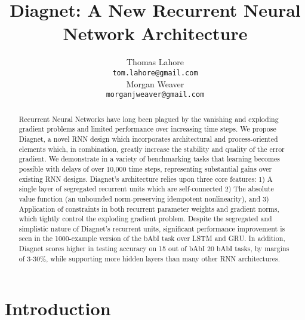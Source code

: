 \documentclass{article}
\title{Diagnet: A New Recurrent Neural Network Architecture}
\author{
	Thomas Lahore\\
	\texttt{tom.lahore@gmail.com}\\
	\And
	Morgan Weaver\\
	\texttt{morganjweaver@gmail.com}
 }
\begin{document}
\maketitle
\begin{abstract}

  Recurrent Neural Networks have long been plagued by the vanishing and exploding gradient problems and limited performance over increasing time steps. We propose Diagnet, a novel RNN design which incorporates architectural and process-oriented elements which, in combination, greatly increase the stability and quality of the error gradient. We demonstrate in a variety of benchmarking tasks that learning becomes possible with delays of over 10,000 time steps, representing substantial gains over existing RNN designs.  Diagnet’s architecture relies upon three core features: 1) A single layer of segregated recurrent units which are self-connected 2) The absolute value function (an unbounded norm-preserving idempotent nonlinearity), and 3) Application of constraints in both recurrent parameter weights and gradient norms, which tightly control the exploding gradient problem.  Despite the segregated and simplistic nature of Diagnet's recurrent units, significant performance improvement is seen in the 1000-example version of the bAbI task over LSTM and GRU. In addition, Diagnet scores higher in testing accuracy on 15 out of bAbI 20  bAbI tasks, by margins of 3-30\%, while supporting more hidden layers than many other RNN architectures. 

\end{abstract}

\section{Introduction}
\end{document}
